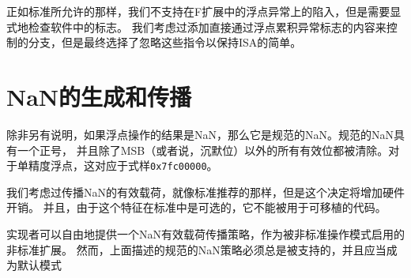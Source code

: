 \begin{commentary}
  正如标准所允许的那样，我们不支持在F扩展中的浮点异常上的陷入，但是需要显式地检查软件中的标志。
  我们考虑过添加直接通过浮点累积异常标志的内容来控制的分支，但是最终选择了忽略这些指令以保持ISA的简单。
\end{commentary}

\section{NaN的生成和传播}

除非另有说明，如果浮点操作的结果是NaN，那么它是规范的NaN。规范的NaN具有一个正号，
并且除了MSB（或者说，沉默位）以外的所有有效位都被清除。对于单精度浮点，这对应于式样{\tt 0x7fc00000}。

\begin{commentary}
  我们考虑过传播NaN的有效载荷，就像标准推荐的那样，但是这个决定将增加硬件开销。
  并且，由于这个特征在标准中是可选的，它不能被用于可移植的代码。

实现者可以自由地提供一个NaN有效载荷传播策略，作为被非标准操作模式启用的非标准扩展。
然而，上面描述的规范的NaN策略必须总是被支持的，并且应当成为默认模式
\end{commentary}

